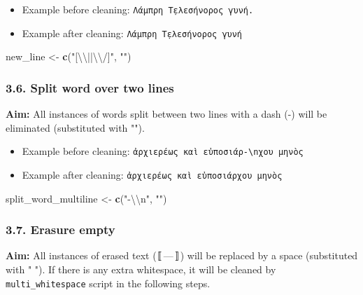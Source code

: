 \documentclass[]{article}
\newenvironment{Shaded}{\begin{snugshade}}{\end{snugshade}}
\newcommand{\CharTok}[1]{\textcolor[rgb]{0.31,0.60,0.02}{#1}}
\newcommand{\KeywordTok}[1]{\textcolor[rgb]{0.13,0.29,0.53}{\textbf{#1}}}
\newcommand{\NormalTok}[1]{#1}
\newcommand{\StringTok}[1]{\textcolor[rgb]{0.31,0.60,0.02}{#1}}
\providecommand{\tightlist}{%
  \setlength{\itemsep}{0pt}\setlength{\parskip}{0pt}}
\begin{document}
\begin{itemize}
\tightlist
\item
  Example before cleaning: \texttt{Λάμπρη\ Τ̣ελεσήνορ\textbar{}ος\ γυνή.}
\item
  Example after cleaning: \texttt{Λάμπρη\ Τ̣ελεσήνορος\ γυνή}
\end{itemize}

\begin{Shaded}
\begin{Highlighting}[]
\NormalTok{new_line <-}\StringTok{ }\KeywordTok{c}\NormalTok{(}\StringTok{"[}\CharTok{\textbackslash{}\textbackslash{}}\StringTok{||}\CharTok{\textbackslash{}\textbackslash{}}\StringTok{/]"}\NormalTok{, }\StringTok{""}\NormalTok{)}
\end{Highlighting}
\end{Shaded}

\hypertarget{split-word-over-two-lines}{%
\subsubsection{3.6. Split word over two
lines}\label{split-word-over-two-lines}}

\textbf{Aim:} All instances of words split between two lines with a dash
(-) will be eliminated (substituted with "").

\begin{itemize}
\tightlist
\item
  Example before cleaning:
  \texttt{ἀρχιερέως\ καὶ\ εὐποσιάρ-\textbackslash{}nχου\ μηνὸς}
\item
  Example after cleaning: \texttt{ἀρχιερέως\ καὶ\ εὐποσιάρχου\ μηνὸς}
\end{itemize}

\begin{Shaded}
\begin{Highlighting}[]
\NormalTok{split_word_multiline <-}\StringTok{ }\KeywordTok{c}\NormalTok{(}\StringTok{"-}\CharTok{\textbackslash{}\textbackslash{}}\StringTok{n"}\NormalTok{, }\StringTok{""}\NormalTok{)}
\end{Highlighting}
\end{Shaded}

\hypertarget{erasure-empty}{%
\subsubsection{3.7. Erasure empty}\label{erasure-empty}}

\textbf{Aim:} All instances of erased text (〚---〛) will be replaced by
a space (substituted with " "). If there is any extra whitespace, it
will be cleaned by \texttt{multi\_whitespace} script in the following
steps.
\end{document}
